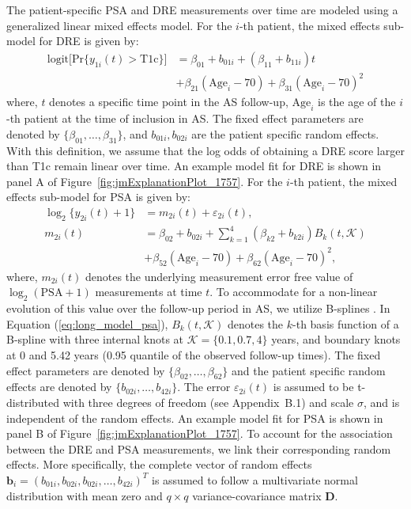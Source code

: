 The patient-specific PSA and DRE measurements over time are modeled using a generalized linear mixed effects model. For the $i$-th patient, the mixed effects sub-model for DRE is given by:
\begin{equation}
\label{eq:long_model_dre}
\begin{split}
    \mbox{logit} \big[\mbox{Pr}\{y_{1i}(t) > \mbox{T1c}\}\big] &= \beta_{01} + b_{01i} + (\beta_{11} + b_{11i}) t\\
    &+ \beta_{21} (\mbox{Age}_i-70) + \beta_{31} (\mbox{Age}_i-70)^2
    \end{split}
\end{equation}
where, $t$ denotes a specific time point in the AS follow-up, $\mbox{Age}_i$ is the age of the $i$-th patient at the time of inclusion in AS. The fixed effect parameters are denoted by $\{\beta_{01}, \ldots, \beta_{31}\}$, and $b_{01i}, b_{02i}$ are the patient specific random effects. With this definition, we assume that the log odds of obtaining a DRE score larger than T1c remain linear over time. An example model fit for DRE is shown in panel A of Figure~\ref{fig:jmExplanationPlot_1757}. For the $i$-th patient, the mixed effects sub-model for PSA is given by:
\begin{equation}
\label{eq:long_model_psa}
\begin{split}
    \log_2 \big\{y_{2i}(t) + 1\big\} &= m_{2i}(t) + \varepsilon_{2i}(t),\\
    m_{2i}(t) &= \beta_{02} + b_{02i} + \sum_{k=1}^4 (\beta_{k2} + b_{k2i})  B_k(t,\mathcal{K})\\ 
    &+ \beta_{52} (\mbox{Age}_i-70) + \beta_{62} (\mbox{Age}_i-70)^2,
    \end{split}
\end{equation}
where, $m_{2i}(t)$ denotes the underlying measurement error free value of $\log_2 (\mbox{PSA} + 1)$ measurements at time $t$. To accommodate for a non-linear evolution of this value over the follow-up period in AS, we utilize B-splines \citep{de1978practical}. In Equation (\ref{eq:long_model_psa}), $B_k(t, \mathcal{K})$ denotes the $k$-th basis function of a B-spline with three internal knots at $\mathcal{K} = \{0.1, 0.7, 4\}$ years, and boundary knots at 0 and 5.42 years (0.95 quantile of the observed follow-up times). The fixed effect parameters are denoted by $\{\beta_{02},\ldots,\beta_{62}\}$ and the patient specific random effects are denoted by $\{b_{02i}, \ldots, b_{42i}\}$. The error $\varepsilon_{2i}(t)$ is assumed to be t-distributed with three degrees of freedom (see Appendix~B.1) and scale $\sigma$, and is independent of the random effects. An example model fit for PSA is shown in panel B of Figure~\ref{fig:jmExplanationPlot_1757}. To account for the association between the DRE and PSA measurements, we link their corresponding random effects. More specifically, the complete vector of random effects ${\boldsymbol{b}_i = (b_{01i}, b_{02i}, b_{02i}, \ldots, b_{42i})^T}$ is assumed to follow a multivariate normal distribution with mean zero and ${q\times q}$ variance-covariance matrix $\boldsymbol{D}$.
